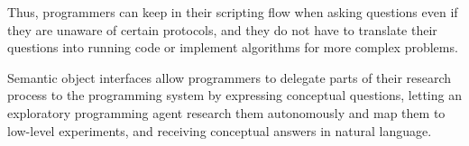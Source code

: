 \noindent
Thus, programmers can keep in their scripting flow when asking questions even if they are unaware of certain protocols, and they do not have to translate their questions into running code or implement algorithms for more complex problems.

\ParSep

Semantic object interfaces allow programmers to delegate parts of their research process to the programming system by expressing conceptual questions, letting an exploratory programming agent research them autonomously and map them to low-level experiments, and receiving conceptual answers in natural language.
